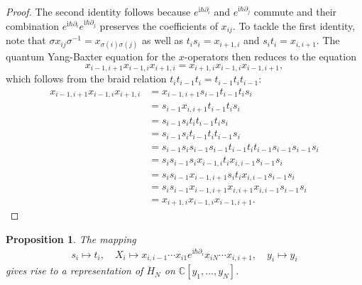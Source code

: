 \documentclass[11pt]{report}
\newtheorem{prop}[theorem]{Proposition}
\theoremstyle{definition}
\theoremstyle{remark}
\theoremstyle{remark}
\newcommand{\C}{\mathbb{C}}
\newcommand{\I}{\mathrm{i}}
\begin{document}
\begin{proof}
The second identity follows because $e^{\I\hbar \partial_i}$ and $e^{\I\hbar \partial_j}$ commute and their combination $e^{\I\hbar \partial_i} e^{\I\hbar \partial_j}$ preserves the coefficients of $x_{ij}$. To tackle the first identity, note that $\sigma x_{ij} \sigma^{-1} = x_{\sigma(i)\sigma(j)}$ as well as $t_i s_i = x_{i+1,i}$ and $s_i t_i = x_{i,i+1}$. The quantum Yang-Baxter equation for the $x$-operators then reduces to the equation
\begin{equation*}
x_{i-1,i+1} x_{i-1,i} x_{i+1,i} = x_{i+1,i} x_{i-1,i} x_{i-1,i+1},
\end{equation*}
which follows from the braid relation $t_i t_{i-1} t_i = t_{i-1} t_i t_{i-1}$:
\begin{align*}
x_{i-1,i+1} x_{i-1,i} x_{i+1,i}
&= x_{i-1,i+1} s_{i-1} t_{i-1} t_i s_i \\
&= s_{i-1} x_{i,i+1} t_{i-1} t_i s_i \\
&= s_{i-1} s_i t_i t_{i-1} t_i s_i \\
&= s_{i-1} s_i t_{i-1} t_i t_{i-1} s_i \\
&= s_{i-1} s_i s_{i-1} s_{i-1} t_{i-1} t_i t_{i-1} s_{i-1} s_{i-1} s_i \\
&= s_i s_{i-1} s_i x_{i-1,i} t_i x_{i,i-1} s_{i-1} s_i \\
&= s_i s_{i-1} x_{i-1,i+1} s_i t_i x_{i,i-1} s_{i-1} s_i \\
&= s_i s_{i-1} x_{i-1,i+1} x_{i,i+1} x_{i,i-1} s_{i-1} s_i \\
&= x_{i+1,i} x_{i-1,i} x_{i-1,i+1}.
\end{align*}
\end{proof}

\begin{prop}
The mapping
\begin{align*}
s_i \mapsto t_i, \quad X_i \mapsto x_{i,i-1} \cdots x_{i1} e^{\I \hbar \partial_i} x_{iN} \cdots x_{i,i+1}, \quad y_i \mapsto y_i
\end{align*}
gives rise to a representation of $\ddot H_N$ on $\C[y_1,...,y_N]$.
\end{prop}
\end{document}

